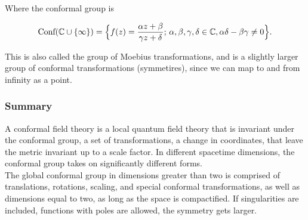 \documentclass[10pt]{article}
\begin{document}
\noindent Where the conformal group is

\begin{equation}
\text{Conf}(\mathbb{C} \cup \{ \infty \} ) = \Big{\{} f(z) = \frac{\alpha z + \beta}{\gamma z + \delta}; \, \alpha, \beta, \gamma, \delta \in \mathbb{C}, \alpha\delta - \beta \gamma \ne 0 \Big{\}}.
\end{equation}

\noindent This is also called the group of Moebius transformations, and is a slightly larger group of conformal transformations (symmetires), since we can map to and from infinity as a point. \\

\subsubsection*{Summary}

\noindent A conformal field theory is a local quantum field theory that is invariant under the conformal group, a set of transformations, a change in coordinates, that leave the metric invariant up to a scale factor. In different spacetime dimensions, the conformal group takes on significantly different forms. \\

\noindent The global conformal group in dimensions greater than two is comprised of translations, rotations, scaling, and special conformal transformations, as well as dimensions equal to two, as long as the space is compactified. If singularities are included, functions with poles are allowed, the symmetry gets larger.

%

\end{document}
